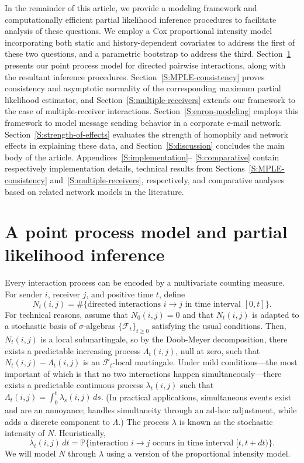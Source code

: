 \documentclass[final]{statsoc}
\begin{document}
In the remainder of this article, we provide a modeling framework and
computationally efficient partial likelihood inference procedures to
facilitate analysis of these questions.  We employ a Cox proportional
intensity model incorporating both static and history-dependent covariates
to address the first of these two questions, and a parametric bootstrap to
address the third. Section~\ref{S:point-process-model} presents our point
process model for directed pairwise interactions, along with the resultant
inference procedures. Section~\ref{S:MPLE-consistency} proves consistency
and asymptotic normality of the corresponding maximum partial likelihood
estimator, and Section~\ref{S:multiple-receivers} extends our framework to
the case of multiple-receiver interactions.  Section~\ref{S:enron-modeling} employs this framework to model message sending behavior in a corporate e-mail network.  Section~\ref{S:strength-of-effects} evaluates the strength of homophily and network effects in explaining these data, and Section~\ref{S:discussion} concludes the main body of the article. Appendices~\ref{S:implementation}--%
\ref{S:comparative} contain respectively implementation details,
technical results from Sections~\ref{S:MPLE-consistency} and~\ref{S:multiple-receivers}, respectively, and comparative analyses based on related network models in the literature.


\section{A point process model and partial likelihood inference}
\label{S:point-process-model}

Every interaction process can be encoded by a multivariate counting measure.
For sender $i$, receiver $j$, and positive time $t$, define
\[
    N_t(i,j)
        =
        \#\{
            \text{directed interactions $i\rightarrow j$ in time interval
            $[0,t]$}
        \}.
\]
For technical reasons, assume that $N_0(i,j) = 0$ and that $N_t(i,j)$ is
adapted to a stochastic basis of $\sigma$-algebras
$\{ \mathcal{F}_t \}_{t \geq 0}$ satisfying the usual conditions.  Then,
$N_t(i,j)$ is a local submartingale, so by the Doob-Meyer decomposition,
there exists a predictable increasing process $\Lambda_t(i,j)$, null at
zero, such that $N_t(i,j) - \Lambda_t(i,j)$ is an $\mathcal{F}_t$-local
martingale.  Under mild conditions---the most important of which is that
no two interactions happen simultaneously---there exists a predictable
continuous process $\lambda_t(i,j)$ such that
\(
    \Lambda_t(i,j) = \int_0^t \lambda_s(i,j) \, ds.
\)
(In practical applications, simultaneous events exist and are an annoyance;
\citet{efron1977efficiency} handles simultaneity through an ad-hoc
adjustment, while \citet{brostrom2002cox} adds a discrete component
to $\Lambda$.)  The process $\lambda$ is known as the stochastic intensity
of $N$.  Heuristically,
\[
    \lambda_t(i,j) \, dt
        =
        \mathbb{P}\{
            \text{interaction $i\rightarrow j$ occurs in time interval $[t,t+dt)$}
        \}.
\]
We will model $N$ through $\lambda$ using a version of the \citet{cox1972regression}
proportional intensity model.
\end{document}
